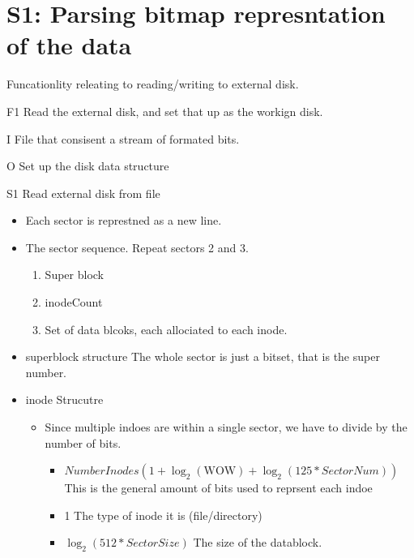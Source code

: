 \documentclass{article}
\date{\today}
\title{}
\begin{document}
\tableofcontents

\section{S1: Parsing bitmap represntation of the data}
\label{sec:org5f0527b}
Funcationlity releating to reading/writing to external disk.
\begin{description}
\item{F1} Read the external disk, and set that up as the workign disk.
\begin{description}
\item{I} File that consisent a stream of formated bits.
\item{O} Set up the disk data structure
\item{S1} Read external disk from file
\begin{itemize}
\item Each sector is represtned as a new line.
\item The sector sequence. Repeat sectors 2 and 3.
\begin{enumerate}
\item Super block
\item inodeCount
\item Set of data blcoks, each allociated to each inode.
\end{enumerate}
\item superblock structure
The whole sector is just a bitset, that is the super number.
\item inode Strucutre
\begin{itemize}
\item Since multiple indoes are within a single sector, we have to divide by the number of bits.
\begin{itemize}
\item \(NumberInodes(1 +  \log_2(\text{WOW}) + \log_2(125 * SectorNum))\) This is the general amount of bits used to reprsent each indoe
\item{1} The type of inode it is (file/directory)
\item{\(\log_2(512*SectorSize)\)} The size of the datablock.
\end{itemize}
\end{itemize}
\end{itemize}
\end{description}
\end{description}
\end{document}
